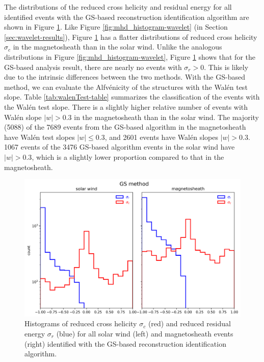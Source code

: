 The distributions of the reduced cross helicity and residual energy for all identified events with the GS-based reconstruction identification algorithm are shown in Figure \ref{fig:mhd_histogram-GS}. Like Figure \ref{fig:mhd_histogram-wavelet} (in Section \ref{sec:wavelet-results}), Figure \ref{fig:mhd_histogram-GS} has a flatter distributions of reduced cross helicity $\sigma_c$ in the magnetosheath than in the solar wind. Unlike the analogous distributions in Figure \ref{fig:mhd_histogram-wavelet}, Figure \ref{fig:mhd_histogram-GS} shows that for the GS-based analysis result, there are nearly no events with $\sigma_r>0$. This is likely due to the intrinsic differences between the two methods. With the GS-based method, we can evaluate the Alfv\'enicity of the structures with the Wal\'en test slope. Table \ref{tab:walenTest-table} summarizes the classification of the events with the Wal\'en test slope. There is a slightly higher relative number of events with Wal\'en slope $|w|>0.3$ in the magnetosheath than in the solar wind. The majority (5088) of the 7689 events from the GS-based algorithm in the magnetosheath have Wal\'en test slopes $|w|\leq 0.3$, and 2601 events have Wal\'en slopes $|w|>0.3$. 1067 events of the 3476 GS-based algorithm events in the solar wind have $|w|>0.3$, which is a slightly lower proportion compared to that in the magnetosheath.

\begin{figure}
    \centering
    \includegraphics[width=\textwidth]{Figures/Histograms/sigr_sigc_GS.png}
    \caption[Reduced cross helicity and reduced residual energy for all events identified via GS-based reconstruction algorithm]{Histograms of reduced cross helicity $\sigma_c$ (red) and reduced residual energy $\sigma_r$ (blue) for all solar wind (left) and magnetosheath events (right) identified with the GS-based reconstruction identification algorithm.}
    \label{fig:mhd_histogram-GS}
\end{figure}

